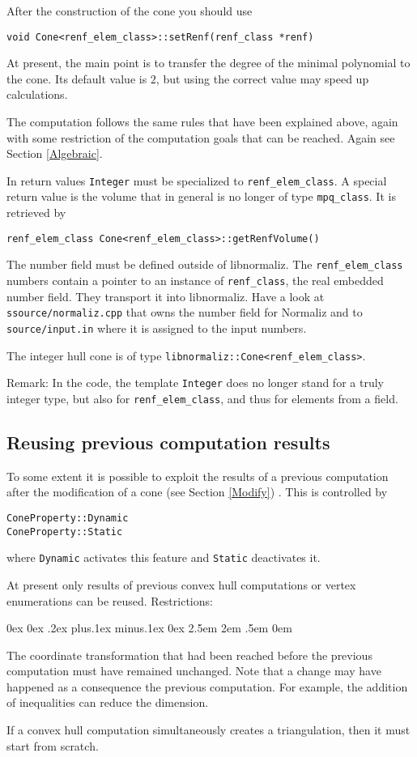 \documentclass[12pt,a4paper]{scrartcl}
\newcounter{listi}
\newcommand{\stdli}{ \topsep0ex \partopsep0ex %
\parsep.2ex plus.1ex minus.1ex \itemsep0ex%
\leftmargin2.5em \labelwidth2em \labelsep.5em \rightmargin0em}%
\newenvironment{arab}{\begin{list}{\textup{(\arabic{listi})}}%
	{\usecounter{listi}\stdli}}{\end{list}}
\theoremstyle{definition}
\def\ttt{\texttt}
\begin{document}
\begin{small}
After the construction of the cone you should use
\begin{Verbatim}
void Cone<renf_elem_class>::setRenf(renf_class *renf)
\end{Verbatim}
At present, the main point is to transfer the degree of the minimal polynomial to the cone. Its default value is $2$, but using the correct value may speed up calculations.

The computation follows the same rules that have been explained above, again with some restriction of the computation goals that can be reached. Again see Section \ref{Algebraic}.

In return values \ttt{Integer} must be specialized to \verb|renf_elem_class|. A special return value is the volume that in general is no longer of type \verb|mpq_class|. It is retrieved by
\begin{Verbatim}
renf_elem_class Cone<renf_elem_class>::getRenfVolume() 
\end{Verbatim}

The number field must be defined outside of libnormaliz. The  \verb|renf_elem_class| numbers contain a pointer to an instance of  \verb|renf_class|, the real embedded number field. They transport it into libnormaliz. Have a look at \verb|ssource/normaliz.cpp| that owns the number field for Normaliz and  to \verb|source/input.in| where it is assigned to the input numbers.

The integer hull cone is of type \verb|libnormaliz::Cone<renf_elem_class>|. 

Remark: In the code, the template \ttt{Integer} does no longer stand for a truly integer type, but also for \verb|renf_elem_class|, and thus for elements from a field.

\subsection{Reusing previous computation results}

To some extent it is possible to exploit the results of a previous computation after the modification of a cone (see Section \ref{Modify}) . This is controlled by 
\begin{Verbatim}
ConeProperty::Dynamic
ConeProperty::Static
\end{Verbatim}
where \verb|Dynamic| activates this feature and \verb|Static| deactivates it. 

At present only results of previous convex hull computations or vertex enumerations can be reused. Restrictions:
\begin{arab}
\item The coordinate transformation that had been reached before the previous computation must have remained unchanged. Note that a change may have happened as a consequence the previous computation. For example, the addition of inequalities can reduce the dimension.
\item If a convex hull computation simultaneously creates a triangulation, then it must start from scratch. 
\end{arab}


\end{small}
\end{document}
